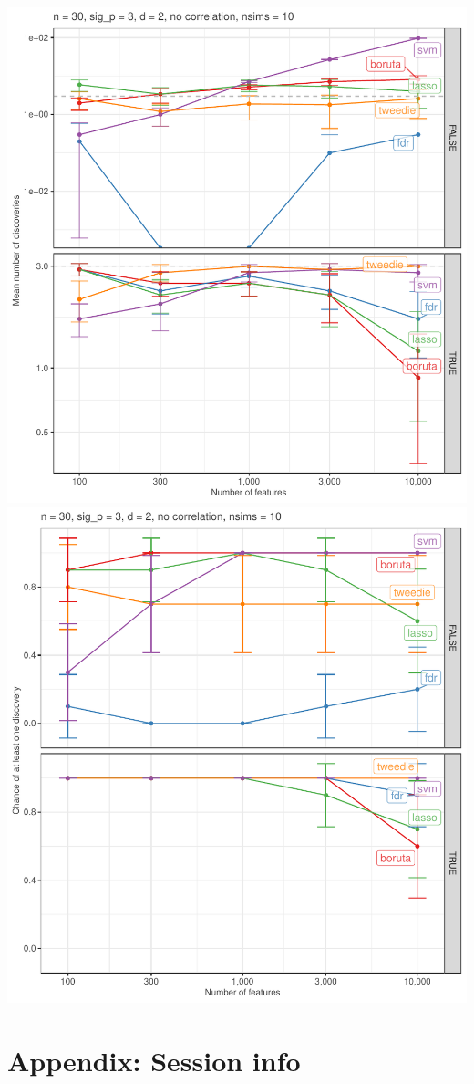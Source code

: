 \documentclass[
]{article}
\begin{document}
\begin{center}\includegraphics[width=0.49\linewidth]{main_files/figure-latex/unnamed-chunk-32-1} \includegraphics[width=0.49\linewidth]{main_files/figure-latex/unnamed-chunk-32-2} \end{center}

\hypertarget{sessioninfo}{%
\section{Appendix: Session info}\label{sessioninfo}}
\end{document}
